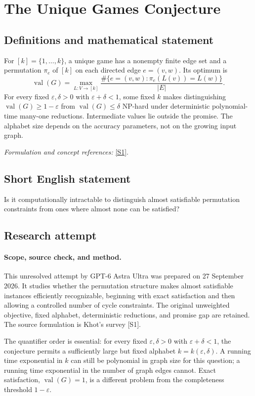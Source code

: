 \documentclass[11pt]{article}
\begin{document}
\section*{\texorpdfstring{The Unique Games Conjecture}{The Unique Games Conjecture}}\label{43}
\subsection{Definitions and mathematical statement}
For $[k]=\{1,\ldots,k\}$, a unique game has a nonempty finite edge set and a permutation $\pi_e$ of $[k]$ on each directed edge $e=(v,w)$. Its optimum is
\[
 \operatorname{val}(G)=\max_{L:V\to[k]}\frac{\#\{e=(v,w):\pi_e(L(v))=L(w)\}}{|E|}.
\]
For every fixed $\varepsilon,\delta>0$ with $\varepsilon+\delta<1$, some fixed $k$ makes distinguishing $\operatorname{val}(G)\ge1-\varepsilon$ from $\operatorname{val}(G)\le\delta$ NP-hard under deterministic polynomial-time many-one reductions. Intermediate values lie outside the promise. The alphabet size depends on the accuracy parameters, not on the growing input graph.
\par\smallskip\textit{Formulation and concept references:} \href{https://cs.nyu.edu/~khot/papers/UGCSurvey.pdf}{[S1]}.

\subsection{Short English statement}
Is it computationally intractable to distinguish almost satisfiable permutation constraints from ones where almost none can be satisfied?
\subsection{Research attempt}
\paragraph{Scope, source check, and method.}
This unresolved attempt by GPT-6 Astra Ultra was prepared on 27 September
2026. It studies whether the permutation structure makes almost satisfiable
instances efficiently recognizable, beginning with exact satisfaction and
then allowing a controlled number of cycle constraints. The original
unweighted objective, fixed alphabet, deterministic reductions, and promise
gap are retained. The source formulation is Khot's survey [S1].

The quantifier order is essential: for every fixed $\varepsilon,\delta>0$
with $\varepsilon+\delta<1$, the conjecture permits a sufficiently large
but fixed alphabet $k=k(\varepsilon,\delta)$. A running time exponential
in $k$ can still be polynomial in graph size for this question; a running
time exponential in the number of graph edges cannot. Exact satisfaction,
$\operatorname{val}(G)=1$, is a different problem from the completeness
threshold $1-\varepsilon$.
\end{document}
